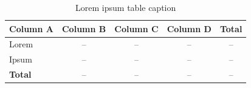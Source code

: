 \begin{table}[!ht]
    \centering
    \renewcommand{\arraystretch}{1.5}
    \caption{Lorem ipsum table caption}
    \begin{tabular}{lcccc}
        \hline
        \textbf{Column A} & \textbf{Column B} & \textbf{Column C} & \textbf{Column D} & \textbf{Total} \\ \hline
        Lorem             & --                & --                & --                & --             \\
        Ipsum             & --                & --                & --                & --             \\ \hline
        \textbf{Total}    & --                & --                & --                & --             \\ \hline
    \end{tabular}
    \label{table-bug-symptom}
\end{table}
